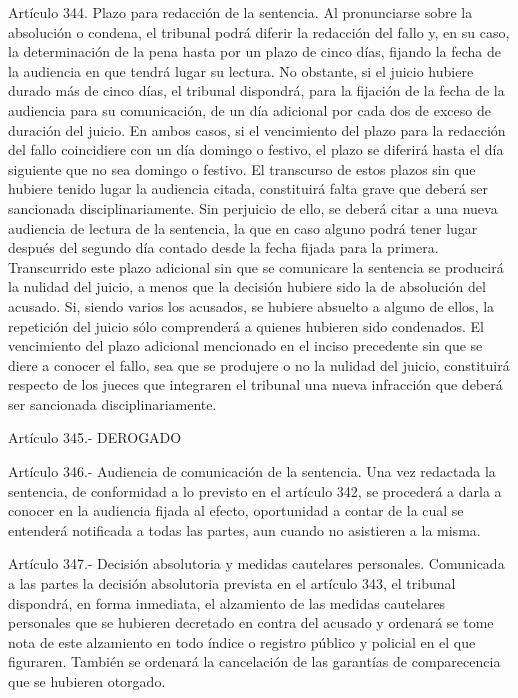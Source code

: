    Artículo 344. Plazo para redacción de la sentencia. Al pronunciarse sobre la absolución o condena, el tribunal podrá diferir la redacción del fallo y, en su caso, la determinación de la pena hasta por un plazo de cinco días, fijando la fecha de la audiencia en que tendrá lugar su lectura. No obstante, si el juicio hubiere durado más de cinco días, el tribunal dispondrá, para la fijación de la fecha de la audiencia para su comunicación, de un día adicional por cada dos de exceso de duración del juicio. En ambos casos, si el vencimiento del plazo para la redacción del fallo coincidiere con un día domingo o festivo, el plazo se diferirá hasta el día siguiente que no sea domingo o festivo. El transcurso de estos plazos sin que hubiere tenido lugar la audiencia citada, constituirá falta grave que deberá ser sancionada disciplinariamente. Sin perjuicio de ello, se deberá citar a una nueva audiencia de lectura de la sentencia, la que en caso alguno podrá tener lugar después del segundo día contado desde la fecha fijada para la primera. Transcurrido este plazo adicional sin que se comunicare la sentencia se producirá la nulidad del juicio, a menos que la decisión hubiere sido la de absolución del acusado. Si, siendo varios los acusados, se hubiere absuelto a alguno de ellos, la repetición del juicio sólo comprenderá a quienes hubieren sido condenados.
    El vencimiento del plazo adicional mencionado en el inciso precedente sin que se diere a conocer el fallo, sea que se produjere o no la nulidad del juicio, constituirá respecto de los jueces que integraren el tribunal una nueva infracción que deberá ser sancionada disciplinariamente.

    Artículo 345.- DEROGADO

    Artículo 346.- Audiencia de comunicación de la sentencia. Una vez redactada la sentencia, de conformidad a lo previsto en el artículo 342, se procederá a darla a conocer en la audiencia fijada al efecto, oportunidad a contar de la cual se entenderá notificada a todas las partes, aun cuando no asistieren a la misma.

    Artículo 347.- Decisión absolutoria y medidas cautelares personales. Comunicada a las partes la decisión absolutoria prevista en el artículo 343, el tribunal dispondrá, en forma inmediata, el alzamiento de las medidas cautelares personales que se hubieren decretado en contra del acusado y ordenará se tome nota de este alzamiento en todo índice o registro público y policial en el que figuraren. También se ordenará la cancelación de las garantías de comparecencia que se hubieren otorgado.

